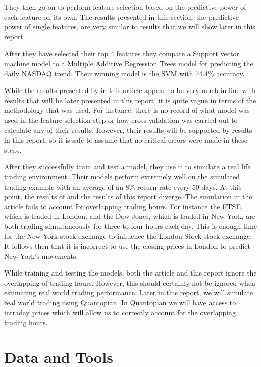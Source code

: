 \documentclass{report}
\begin{document}
They then go on to perform feature selection based on the predictive power of each feature on its own. The results presented in this section, the predictive power of single features, are very similar to results that we will show later in this report. 

After they have selected their top 4 features they compare a Support vector machine model to a Multiple Additive Regression Trees model for predicting the daily NASDAQ trend. Their winning model is the SVM with 74.4\% accuracy. 

While the results presented by \citet{shen2012stock} in this article appear to be very much in line with results that will be later presented in this report, it is quite vague in terms of the methodology that was used. For instance, there is no record of what model was used in the feature selection step or how cross-validation was carried out to calculate any of their results. However, their results will be supported by results in this report, so it is safe to assume that no critical errors were made in these steps.

After they successfully train and test a model, they use it to simulate a real life trading environment. Their models perform extremely well on the simulated trading example with an average of an 8\% return rate every 50 days. At this point, the results of \citet{shen2012stock} and the results of this report diverge. The simulation in the article fails to account for overlapping trading hours. For instance the FTSE, which is traded in London, and the Dow Jones, which is traded in New York, are both trading simultaneously for three to four hours each day. This is enough time for the New York stock exchange to influence the London Stock stock exchange. It follows then that it is incorrect to use the closing prices in London to predict New York's movements.

While training and testing the models, both the article and this report ignore the overlapping of trading hours. However, this should certainly not be ignored when estimating real world trading performance. Later in this report, we will simulate real world trading using Quantopian. In Quantopian we will have access to intraday prices which will allow us to correctly account for the overlapping trading hours.  

\chapter{Data and Tools}
\end{document}
